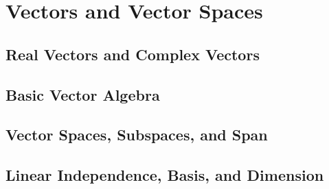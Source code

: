 \documentclass[12pt]{article}
\theoremstyle{definition}
\begin{document}
\break


\section{Vectors and Vector Spaces}

\subsection{Real Vectors and Complex Vectors}

\subsection{Basic Vector Algebra}

\subsection{Vector Spaces, Subspaces, and Span}

\subsection{Linear Independence, Basis, and Dimension}
\end{document}
